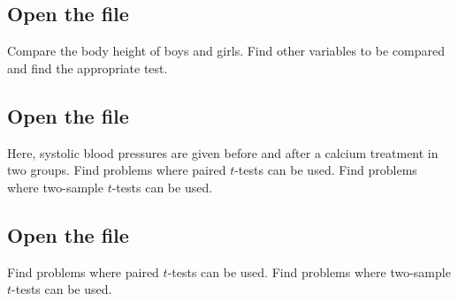 \subsection[ANTHROPOMETRICS.csv]{Open the file }
Compare the body height of boys and girls. Find other variables to be compared and find the appropriate test.

\subsection[CALC.csv]{Open the file }
Here, systolic blood pressures are given before and after a calcium treatment in two groups. Find problems where paired $t$-tests can be used. Find problems where two-sample $t$-tests can be used. 

\subsection[NEWDRUG.csv]{Open the file }
Find problems where paired $t$-tests can be used. Find problems where two-sample $t$-tests can be used.
